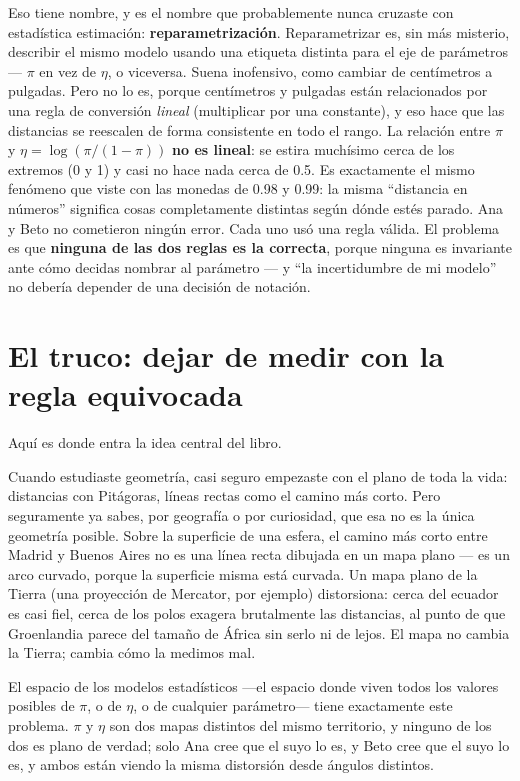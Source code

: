Eso tiene nombre, y es el nombre que probablemente nunca cruzaste con estadística estimación: \textbf{reparametrización}. Reparametrizar es, sin más misterio, describir el mismo modelo usando una etiqueta distinta para el eje de parámetros --- $\pi$ en vez de $\eta$, o viceversa. Suena inofensivo, como cambiar de centímetros a pulgadas. Pero no lo es, porque centímetros y pulgadas están relacionados por una regla de conversión \emph{lineal} (multiplicar por una constante), y eso hace que las distancias se reescalen de forma consistente en todo el rango. La relación entre $\pi$ y $\eta = \log(\pi/(1-\pi))$ \textbf{no es lineal}: se estira muchísimo cerca de los extremos (0 y 1) y casi no hace nada cerca de 0.5. Es exactamente el mismo fenómeno que viste con las monedas de 0.98 y 0.99: la misma ``distancia en números'' significa cosas completamente distintas según dónde estés parado. Ana y Beto no cometieron ningún error. Cada uno usó una regla válida. El problema es que \textbf{ninguna de las dos reglas es la correcta}, porque ninguna es invariante ante cómo decidas nombrar al parámetro --- y ``la incertidumbre de mi modelo'' no debería depender de una decisión de notación.

\section*{El truco: dejar de medir con la regla equivocada}

Aquí es donde entra la idea central del libro.

Cuando estudiaste geometría, casi seguro empezaste con el plano de toda la vida: distancias con Pitágoras, líneas rectas como el camino más corto. Pero seguramente ya sabes, por geografía o por curiosidad, que esa no es la única geometría posible. Sobre la superficie de una esfera, el camino más corto entre Madrid y Buenos Aires no es una línea recta dibujada en un mapa plano --- es un arco curvado, porque la superficie misma está curvada. Un mapa plano de la Tierra (una proyección de Mercator, por ejemplo) distorsiona: cerca del ecuador es casi fiel, cerca de los polos exagera brutalmente las distancias, al punto de que Groenlandia parece del tamaño de África sin serlo ni de lejos. El mapa no cambia la Tierra; cambia cómo la medimos mal.

El espacio de los modelos estadísticos ---el espacio donde viven todos los valores posibles de $\pi$, o de $\eta$, o de cualquier parámetro--- tiene exactamente este problema. $\pi$ y $\eta$ son dos mapas distintos del mismo territorio, y ninguno de los dos es plano de verdad; solo Ana cree que el suyo lo es, y Beto cree que el suyo lo es, y ambos están viendo la misma distorsión desde ángulos distintos.

